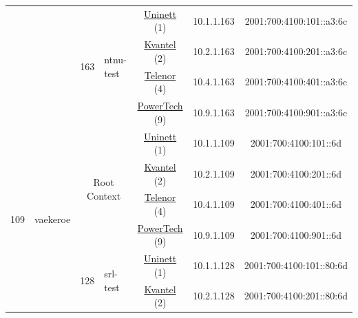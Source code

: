 \begin{small}
\begin{center}
\begin{longtable}{|c|c|c|c|c|c|c|c|}
  &  & \multirow{4}{*}{\tiny{163}} & \multicolumn{1}{|l|}{\multirow{4}{*}{\tiny{ntnu-test}}} & \multicolumn{2}{|c|}{\tiny{\href{https://www.uninett.no}{Uninett} (1)}} & \tiny{10.1.1.163} & \tiny{2001:700:4100:101::a3:6c} \\* \cline{5-5}\cline{6-6}\cline{7-7}\cline{8-8}
  &  &  &  & \multicolumn{2}{|c|}{\tiny{\href{http://kvantel.no}{Kvantel} (2)}} & \tiny{10.2.1.163} & \tiny{2001:700:4100:201::a3:6c} \\* \cline{5-5}\cline{6-6}\cline{7-7}\cline{8-8}
  &  &  &  & \multicolumn{2}{|c|}{\tiny{\href{https://www.telenor.no}{Telenor} (4)}} & \tiny{10.4.1.163} & \tiny{2001:700:4100:401::a3:6c} \\* \cline{5-5}\cline{6-6}\cline{7-7}\cline{8-8}
  &  &  &  & \multicolumn{2}{|c|}{\tiny{\href{http://www.powertech.no}{PowerTech} (9)}} & \tiny{10.9.1.163} & \tiny{2001:700:4100:901::a3:6c} \\ \hline
 \multirow{24}{*}{\tiny{109}} & \multicolumn{1}{|l|}{\multirow{24}{*}{\tiny{vaekeroe}}} & \multicolumn{2}{|c|}{\multirow{4}{*}{\tiny{Root Context}}} & \multicolumn{2}{|c|}{\tiny{\href{https://www.uninett.no}{Uninett} (1)}} & \tiny{10.1.1.109} & \tiny{2001:700:4100:101::6d} \\* \cline{5-5}\cline{6-6}\cline{7-7}\cline{8-8}
  &  & \multicolumn{2}{|c|}{} & \multicolumn{2}{|c|}{\tiny{\href{http://kvantel.no}{Kvantel} (2)}} & \tiny{10.2.1.109} & \tiny{2001:700:4100:201::6d} \\* \cline{5-5}\cline{6-6}\cline{7-7}\cline{8-8}
  &  & \multicolumn{2}{|c|}{} & \multicolumn{2}{|c|}{\tiny{\href{https://www.telenor.no}{Telenor} (4)}} & \tiny{10.4.1.109} & \tiny{2001:700:4100:401::6d} \\* \cline{5-5}\cline{6-6}\cline{7-7}\cline{8-8}
  &  & \multicolumn{2}{|c|}{} & \multicolumn{2}{|c|}{\tiny{\href{http://www.powertech.no}{PowerTech} (9)}} & \tiny{10.9.1.109} & \tiny{2001:700:4100:901::6d} \\* \cline{3-3}\cline{4-4}\cline{5-5}\cline{6-6}\cline{7-7}\cline{8-8}
  &  & \multirow{4}{*}{\tiny{128}} & \multicolumn{1}{|l|}{\multirow{4}{*}{\tiny{srl-test}}} & \multicolumn{2}{|c|}{\tiny{\href{https://www.uninett.no}{Uninett} (1)}} & \tiny{10.1.1.128} & \tiny{2001:700:4100:101::80:6d} \\* \cline{5-5}\cline{6-6}\cline{7-7}\cline{8-8}
  &  &  &  & \multicolumn{2}{|c|}{\tiny{\href{http://kvantel.no}{Kvantel} (2)}} & \tiny{10.2.1.128} & \tiny{2001:700:4100:201::80:6d} \\* \cline{5-5}\cline{6-6}\cline{7-7}\cline{8-8}

\end{longtable}
\end{center}
\end{small}
